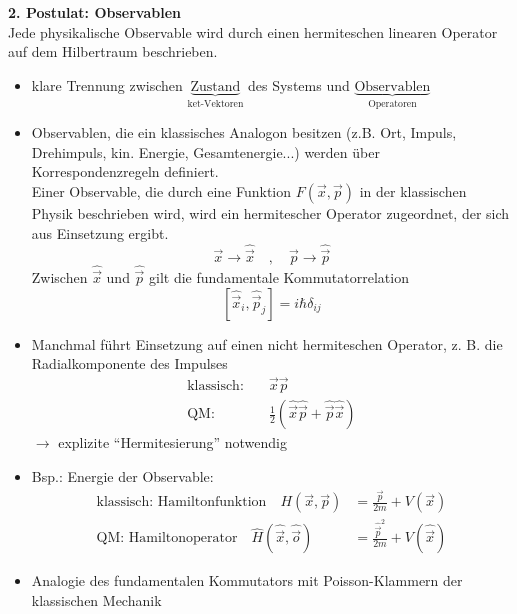 \documentclass[10pt,article,colorback,accentcolor=tud9d]{scrartcl}
\begin{document}
  \noindent\textbf{2. Postulat: Observablen}\\
    Jede physikalische Observable wird durch einen hermiteschen linearen Operator auf dem Hilbertraum beschrieben. 
    \begin{itemize}
      \item klare Trennung zwischen $\underbrace{\text{Zustand}}_{\text{ket-Vektoren}}$ des Systems und $\underbrace{\text{Observablen}}_{\text{Operatoren}}$
      \item Observablen, die ein klassisches Analogon besitzen (z.B. Ort, Impuls, Drehimpuls, kin. Energie, Gesamtenergie...) werden über Korrespondenzregeln definiert. \\
        Einer Observable, die durch eine Funktion $F(\vec{x},\vec{p})$ in der klassischen Physik beschrieben wird, wird ein hermitescher Operator zugeordnet, der sich aus Einsetzung ergibt. 
        $$
        \vec{x} \rightarrow \hat{\vec{x}} \quad, \quad \vec{p} \rightarrow \hat{\vec{p}}
        $$
        Zwischen $\hat{\vec{x}}$ und $\hat{\vec{p}}$ gilt die fundamentale Kommutatorrelation
        \begin{equation}
        \left[\hat{\vec{x}}_i, \hat{\vec{p}}_j\right]=i\hbar\delta_{ij}
        \end{equation}
      \item Manchmal führt Einsetzung auf einen nicht hermiteschen Operator, z. B. die Radialkomponente des Impulses
        \begin{equation}
        \begin{aligned}
          \text{klassisch:} \quad &\vec{x}\vec{p}\\
          \text{QM:} \quad &\frac{1}{2}\left(\hat{\vec{x}}\hat{\vec{p}}+\hat{\vec{p}}\hat{\vec{x}}\right)
        \end{aligned}
        \end{equation}
        $\rightarrow$ explizite "`Hermitesierung"' notwendig
      \item Bsp.: Energie der Observable:
        \begin{equation}
        \begin{aligned}
          \text{klassisch: Hamiltonfunktion} \quad H(\vec{x},\vec{p})&=\frac{\vec{p}}{2m} + V(\vec{x})\\
          \text{QM: Hamiltonoperator} \quad \hat{H}(\hat{\vec{x}},\hat{\vec{o}})&=\frac{\hat{\vec{p}}^2}{2m}+V(\hat{\vec{x}})
        \end{aligned}
        \end{equation}
      \item Analogie des fundamentalen Kommutators mit Poisson-Klammern der klassischen Mechanik

\end{itemize}
\end{document}
